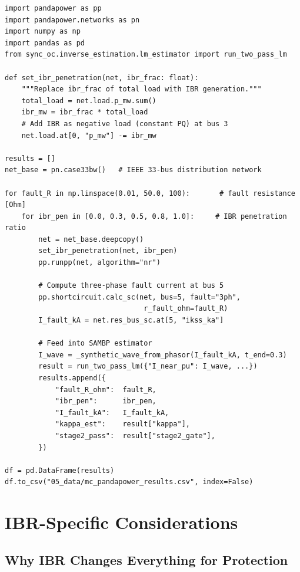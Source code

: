 \documentclass[11pt,a4paper]{article}
\begin{document}
\begin{lstlisting}[style=python, caption={MC sweep using pandapower (upgrade to main\_batch\_study.py)}]
import pandapower as pp
import pandapower.networks as pn
import numpy as np
import pandas as pd
from sync_oc.inverse_estimation.lm_estimator import run_two_pass_lm

def set_ibr_penetration(net, ibr_frac: float):
    """Replace ibr_frac of total load with IBR generation."""
    total_load = net.load.p_mw.sum()
    ibr_mw = ibr_frac * total_load
    # Add IBR as negative load (constant PQ) at bus 3
    net.load.at[0, "p_mw"] -= ibr_mw

results = []
net_base = pn.case33bw()   # IEEE 33-bus distribution network

for fault_R in np.linspace(0.01, 50.0, 100):       # fault resistance [Ohm]
    for ibr_pen in [0.0, 0.3, 0.5, 0.8, 1.0]:     # IBR penetration ratio
        net = net_base.deepcopy()
        set_ibr_penetration(net, ibr_pen)
        pp.runpp(net, algorithm="nr")

        # Compute three-phase fault current at bus 5
        pp.shortcircuit.calc_sc(net, bus=5, fault="3ph",
                                 r_fault_ohm=fault_R)
        I_fault_kA = net.res_bus_sc.at[5, "ikss_ka"]

        # Feed into SAMBP estimator
        I_wave = _synthetic_wave_from_phasor(I_fault_kA, t_end=0.3)
        result = run_two_pass_lm({"I_near_pu": I_wave, ...})
        results.append({
            "fault_R_ohm":  fault_R,
            "ibr_pen":      ibr_pen,
            "I_fault_kA":   I_fault_kA,
            "kappa_est":    result["kappa"],
            "stage2_pass":  result["stage2_gate"],
        })

df = pd.DataFrame(results)
df.to_csv("05_data/mc_pandapower_results.csv", index=False)
\end{lstlisting}

\section{IBR-Specific Considerations}

\subsection{Why IBR Changes Everything for Protection}
\end{document}
